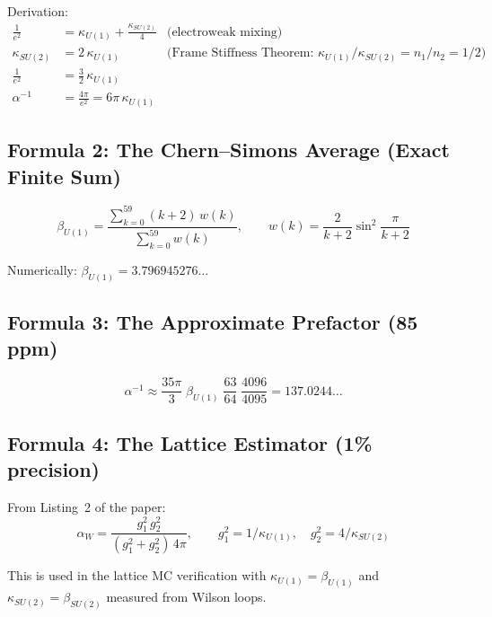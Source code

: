 \documentclass[11pt]{article}
\begin{document}
Derivation:
\begin{align}
\frac{1}{e^2} &= \kappa_{U(1)} + \frac{\kappa_{SU(2)}}{4}
  & \text{(electroweak mixing)} \\
\kappa_{SU(2)} &= 2\,\kappa_{U(1)}
  & \text{(Frame Stiffness Theorem: } \kappa_{U(1)}/\kappa_{SU(2)} = n_1/n_2 = 1/2\text{)} \\
\frac{1}{e^2} &= \frac{3}{2}\,\kappa_{U(1)} \\
\alpha^{-1} &= \frac{4\pi}{e^2} = 6\pi\,\kappa_{U(1)}
\end{align}

\subsection{Formula 2: The Chern--Simons Average (Exact Finite Sum)}

\begin{equation}
\boxed{
\beta_{U(1)} = \frac{\displaystyle\sum_{k=0}^{59}(k+2)\,w(k)}
                     {\displaystyle\sum_{k=0}^{59} w(k)},
\qquad
w(k) = \frac{2}{k+2}\sin^2\!\frac{\pi}{k+2}
}
\end{equation}

Numerically: $\beta_{U(1)} = 3.796945276\ldots$

\subsection{Formula 3: The Approximate Prefactor (85 ppm)}

\begin{equation}
\boxed{
\alpha^{-1} \approx \frac{35\pi}{3}\;\beta_{U(1)}
  \;\frac{63}{64}\;\frac{4096}{4095}
= 137.0244\ldots
}
\end{equation}

\subsection{Formula 4: The Lattice Estimator (1\% precision)}

From Listing~2 of the paper:
\begin{equation}
\alpha_W = \frac{g_1^2\,g_2^2}{(g_1^2 + g_2^2)\,4\pi},
\qquad g_1^2 = 1/\kappa_{U(1)}, \quad g_2^2 = 4/\kappa_{SU(2)}
\end{equation}

This is used in the lattice MC verification with
$\kappa_{U(1)} = \beta_{U(1)}$ and $\kappa_{SU(2)} = \beta_{SU(2)}$
measured from Wilson loops.

\end{document}
